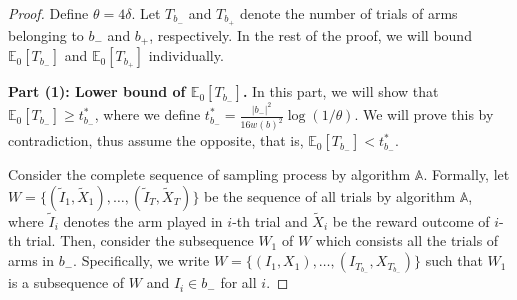 \documentclass{article}
\newcommand{\E}{\mathbb E}
\begin{document}
\begin{proof}
Define $\theta=4\delta$.
Let $T_{b_-}$ and $T_{b_+}$ denote the number of trials of arms belonging to $b_-$ and $b_+$, respectively. 
In the rest of the proof, we will bound $\E_0[T_{b_-}]$ and $\E_0[T_{b_+}]$ individually.



\textbf{Part (1): Lower bound of $\E_0[T_{b_-}]$.}
In this part, we will show that $\E_0[T_{b_-}]\ge t_{b_-}^*$, where we define $t_{b_-}^* = \frac{|b_-|^2}{16 w(b)^2}\log(1/\theta)$.
We will prove this by contradiction, thus assume the opposite, that is, $\E_0[T_{b_-}] < t_{b_-}^*$.

Consider the complete sequence of sampling process by algorithm $\mathbb A$.
Formally, let $W=\{(\tilde I_1,\tilde X_1),\ldots, (\tilde I_T, \tilde X_T)\}$ be the sequence of all trials by algorithm $\mathbb A$, where $\tilde I_i$ denotes the arm played in $i$-th trial and $\tilde X_i$ be the reward outcome of $i$-th trial.
Then, consider the subsequence $W_1$ of $W$ which consists all the trials of arms in $b_-$.
Specifically, we write $W=\{(I_1,X_1),\ldots,(I_{T_{b_-}}, X_{T_{b_-}})\}$ such that $W_1$ is a subsequence of $W$ and $I_i \in b_-$ for all $i$.


\end{proof}
\end{document}

